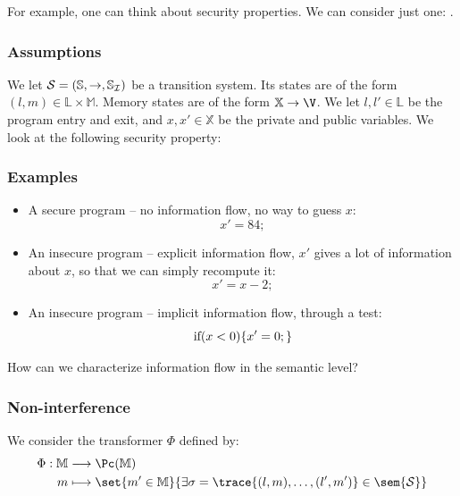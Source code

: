 \documentclass[toc]{../cs-classes/cs-classes}
\begin{document}
For example, one can think about security properties. We can consider just one: .

\subsubsection{Assumptions}
We let $\mathcal{S}=(\mathbb{S}, \to, \mathbb{S}_{\mathcal{I}})$ be a transition system. Its states are of the form $(l, m)\in\mathbb{L}\times\mathbb{M}$. Memory states are of the form $\mathbb{X}\to\V$. We let $l, l'\in\mathbb{L}$ be the program entry and exit, and $x, x'\in\mathbb{X}$ be the private and public variables. We look at the following security property:
\begin{center}
\end{center}

\subsubsection{Examples}
\begin{itemize}
    \item A secure program -- no information flow, no way to guess $x$:
    \begin{equation*}
        x' = 84;
    \end{equation*}
    \item An insecure program -- explicit information flow, $x'$ gives a lot of information about $x$, so that we can simply recompute it:
    \begin{equation*}
        x'=x-2;
    \end{equation*}
    \item An insecure program -- implicit information flow, through a test:
    \begin{equation*}
        \textnormal{if} (x<0) \{ x'=0; \}
    \end{equation*}
\end{itemize}
How can we characterize information flow in the semantic level?

\subsubsection{Non-interference}
We consider the transformer $\Phi$ defined by:
\begin{equation*}
    \begin{aligned}
        \Phi : \mathbb{M} &\longrightarrow \Pc(\mathbb{M})\\
        m &\longmapsto \set{m'\in\mathbb{M}}{\exists \sigma = \trace{(l, m), \dots, (l', m')}\in\sem{\Sc}}
    \end{aligned}
\end{equation*}
\end{document}
